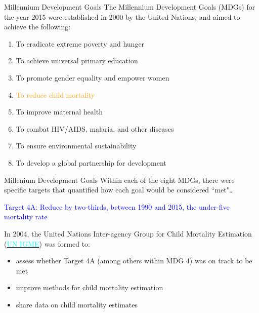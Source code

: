 \documentclass[10pt,t]{beamer}
\begin{document}
\begin{frame}{Millennium Development Goals}
The Millennium Development Goals (MDGs) for the year 2015 were established in 2000 by the United Nations, and aimed to achieve the following:
\vspace{0.3cm}

\begin{enumerate}
	\item To eradicate extreme poverty and hunger
	\item To achieve universal primary education
	\item To promote gender equality and empower women
	\item \textcolor{orange}{To reduce child mortality}
	\item To improve maternal health
	\item To combat HIV/AIDS, malaria, and other diseases
	\item To ensure environmental sustainability
	\item To develop a global partnership for development
\end{enumerate} 

\end{frame}

\begin{frame}{Millenium Development Goals}
Within each of the eight MDGs, there were specific targets that quantified how each goal would be considered ``met"\dots \pause

\vspace{0.3cm}

\textcolor{blue}{Target 4A: Reduce by two-thirds, between 1990 and 2015, the under-five mortality rate} \pause

\vspace{0.3cm}

In 2004, the United Nations Inter-agency Group for Child Mortality Estimation (\href{https://childmortality.org/}{\textcolor{cyan}{UN IGME}}) was formed to:

\vspace{0.3cm}

\begin{itemize}
	\item assess whether Target 4A (among others within MDG 4) was on track to be met
	\item improve methods for child mortality estimation
	\item share data on child mortality estimates
\end{itemize}

\end{frame}
\end{document}
